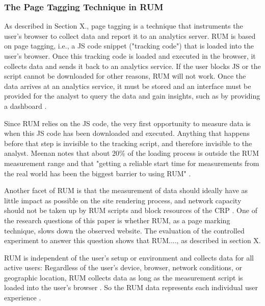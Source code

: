 \subsubsection{The Page Tagging Technique in RUM} %


As described in Section X., page tagging is a technique that instruments the user's browser to collect data and report it to an analytics server.
RUM is based on page tagging, i.e., a JS code snippet ("tracking code") that is loaded into the user's browser.
Once this tracking code is loaded and executed in the browser, it collects data and sends it back to an analytics service.
If the user blocks JS or the script cannot be downloaded for other reasons, RUM will not work.
Once the data arrives at an analytics service, it must be stored and an interface must be provided for the analyst to query the data and gain insights, such as by providing a dashboard \cite{2021Wingerath}.

Since RUM relies on the JS code, the very first opportunity to measure data is when this JS code has been downloaded and executed.
Anything that happens before that step is invisible to the tracking script, and therefore invisible to the analyst.
Meenan notes that about 20\% of the loading process is outside the RUM measurement range and that "getting a reliable start time for measurements from the real world has been the biggest barrier to using RUM" \cite{2013Meenan}.

Another facet of RUM is that the measurement of data should ideally have as little impact as possible on the site rendering process, and network capacity should not be taken up by RUM scripts and block resources of the CRP \cite{2021Wingerath}.
One of the research questions of this paper is whether RUM, as a page marking technique, slows down the observed website.
The evaluation of the controlled experiment to answer this question shows that RUM...., as described in section X. %


RUM is independent of the user's setup or environment and collects data for all active users:
Regardless of the user's device, browser, network conditions, or geographic location, RUM collects data as long as the measurement script is loaded into the user's browser \cite{2021MDNRUMvsSynthetic}.
So the RUM data represents each individual user experience \cite{2016Viscomi}.

